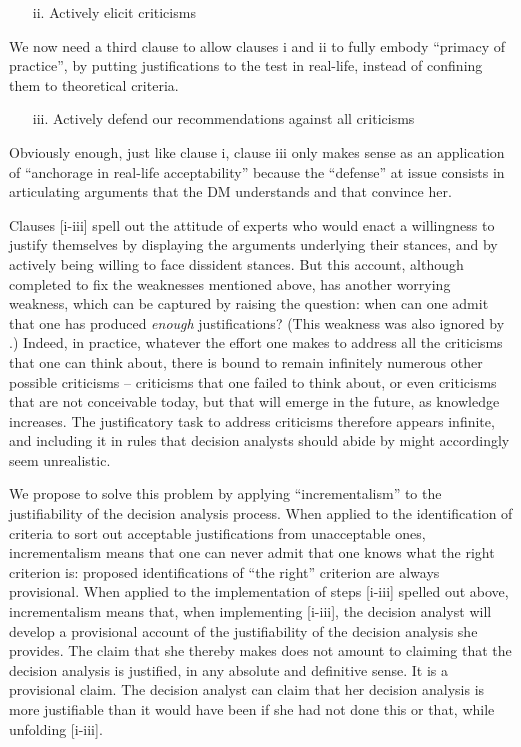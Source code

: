 \documentclass[preprint, french, english, 11pt, authoryear]{elsarticle}%
\begin{document}
\begin{itemize}
\item[ii.]	Actively elicit criticisms
\end{itemize}

We now need a third clause to allow clauses i and ii to fully embody “primacy of practice”, by putting justifications to the test in real-life, instead of confining them to theoretical criteria.

\begin{itemize}
\item[iii.]	 Actively defend our recommendations against all criticisms
\end{itemize}

 Obviously enough, just like clause i, clause iii only makes sense as an application of ``anchorage in real-life acceptability'' because the ``defense'' at issue consists in articulating arguments that the \ac{DM} understands and that convince her.

Clauses [i-iii] spell out the attitude of experts who would enact a willingness to justify themselves by displaying the arguments underlying their stances, and by actively being willing to face dissident stances. But this account, although completed to fix the weaknesses mentioned above, has another worrying weakness, which can be captured by raising the question: when can one admit that one has produced \emph{enough} justifications? (This weakness was also ignored by  \citet{meinard_what_2017}.) Indeed, in practice, whatever the effort one makes to address all the criticisms that one can think about, there is bound to remain infinitely numerous other possible criticisms -- criticisms that one failed to think about, or even criticisms that are not conceivable today, but that will emerge in the future, as knowledge increases. The justificatory task to address criticisms therefore appears infinite, and including it in rules that decision analysts should abide by might accordingly seem unrealistic.

We propose to solve this problem by applying ``incrementalism'' to the justifiability of the decision analysis process. When applied to the identification of criteria to sort out acceptable justifications from unacceptable ones, incrementalism means that one can never admit that one knows what the right criterion is: proposed identifications of ``the right'' criterion are always provisional. When applied to the implementation of steps [i-iii] spelled out above, incrementalism means that, when implementing [i-iii], the decision analyst will develop a provisional account of the justifiability of the decision analysis she provides. The claim that she thereby makes does not amount to claiming that the decision analysis is justified, in any absolute and definitive sense. It is a provisional claim. The decision analyst can claim that her decision analysis is more justifiable than it would have been if she had not done this or that, while unfolding [i-iii].
\end{document}
